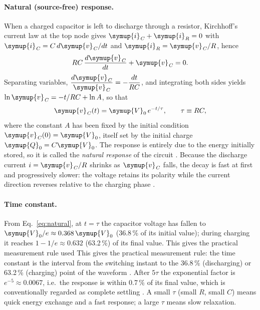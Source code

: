 \documentclass[12pt,a4paper]{article}
\begin{document}
	\paragraph{Natural (source-free) response.}
	When a charged capacitor is left to discharge through a resistor,
	Kirchhoff's current law at the top node gives $\symup{i}_{\mathit{C}} + \symup{i}_{\mathit{R}} = 0$ with
	$\symup{i}_{\mathit{C}} = C\,d\symup{v}_{\mathit{C}}/dt$ and $\symup{i}_{\mathit{R}} = \symup{v}_{\mathit{C}}/R$, hence
	\begin{equation}
		RC\,\frac{d\symup{v}_{\mathit{C}}}{dt} + \symup{v}_{\mathit{C}} = 0 .
		\label{eq:natural-ode}
	\end{equation}
	Separating variables, $\dfrac{d\symup{v}_{\mathit{C}}}{\symup{v}_{\mathit{C}}} = -\dfrac{dt}{RC}$, and
	integrating both sides yields
	$\ln \symup{v}_{\mathit{C}} = -t/RC + \ln A$, so that
	\begin{equation}
		\symup{v}_{\mathit{C}}(t) = \symup{V}_{0}\, e^{-t/\tau}, \qquad \tau \equiv RC,
		\label{eq:natural}
	\end{equation}
	where the constant $A$ has been fixed by the initial condition
	$\symup{v}_{\mathit{C}}(0) = \symup{V}_{0}$, itself set by the initial charge $\symup{Q}_{0} = C \symup{V}_{0}$.  The
	response is entirely due to the energy initially stored, so it is
	called the \emph{natural response} of the circuit \cite{sadiku}.
	Because the discharge current $i = \symup{v}_{\mathit{C}}/R$ shrinks as $\symup{v}_{\mathit{C}}$ falls, the
	decay is fast at first and progressively slower: the voltage retains
	its polarity while the current direction reverses relative to the
	charging phase \cite{boylestad}.
	
	\paragraph{Time constant.}
	From Eq.~\eqref{eq:natural}, at $t = \tau$ the capacitor voltage has
	fallen to $\symup{V}_{0}/e \approx 0.368\,\symup{V}_{0}$ (36.8\,\% of its initial value);
	during charging it reaches $1 - 1/e \approx 0.632$ (63.2\,\%) of its
	final value.  This gives the practical measurement rule used
	This gives the practical measurement rule: the time constant is the interval from the
	switching instant to the 36.8\,\% (discharging) or 63.2\,\%
	(charging) point of the waveform \cite{boylestad}.  After $5\tau$ the
	exponential factor is $e^{-5} \approx 0.0067$, i.e.\ the response is
	within 0.7\,\% of its final value, which is conventionally regarded
	as complete settling \cite{sadiku}.  A small $\tau$ (small $R$, small
	$C$) means quick energy exchange and a fast response; a large $\tau$
	means slow relaxation.
	
\end{document}
